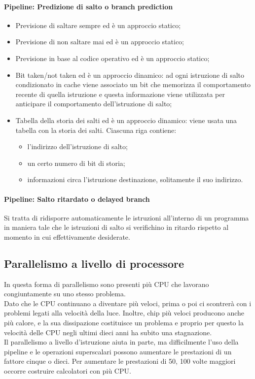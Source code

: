 \documentclass[12pt]{report}
\begin{document}
\paragraph{Pipeline: Predizione di salto o branch prediction}
\begin{itemize}
	\item Previsione di saltare sempre ed è un approccio statico;
	\item Previsione di non saltare mai ed è un approccio statico;
	\item Previsione in base al codice operativo ed è un approccio statico;
	\item Bit taken/not taken ed è un approccio dinamico: ad ogni istruzione di salto condizionato in cache viene associato un bit che memorizza il comportamento recente di quella istruzione e questa informazione viene utilizzata per anticipare il comportamento dell'istruzione di salto;
	\item Tabella della storia dei salti ed è un approccio dinamico: viene usata una tabella con la storia dei salti. Ciascuna riga contiene:
	\begin{itemize}
		\item l'indirizzo dell'istruzione di salto;
		\item un certo numero di bit di storia;
		\item informazioni circa l'istruzione destinazione, solitamente il suo indirizzo.
	\end{itemize}
\end{itemize}
\paragraph{Pipeline: Salto ritardato o delayed branch} Si tratta di ridisporre automaticamente le istruzioni all'interno di un programma in maniera tale che le istruzioni di salto si verifichino in ritardo rispetto al momento in cui effettivamente desiderate.
\subsection{Parallelismo a livello di processore}
In questa forma di parallelismo sono presenti più CPU che lavorano congiuntamente su uno stesso problema. \\
Dato che le CPU continuano a diventare più veloci, prima o poi ci scontrerà con i problemi legati alla velocità della luce. Inoltre, chip più veloci producono anche più calore, e la sua dissipazione costituisce un problema e proprio per questo la velocità delle CPU negli ultimi dieci anni ha subito una stagnazione. \\
Il parallelismo a livello d'istruzione aiuta in parte, ma difficilmente l'uso della pipeline e le operazioni superscalari possono aumentare le prestazioni di un fattore cinque o dieci. Per aumentare le prestazioni di 50, 100 volte maggiori occorre costruire calcolatori con più CPU.
\end{document}

